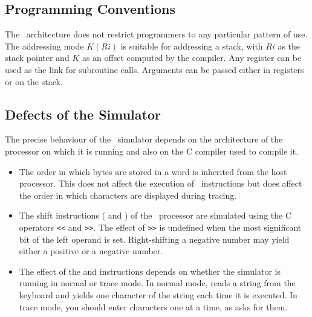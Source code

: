 \subsection{Programming Conventions}

The \moon\ architecture does not restrict programmers to any particular
pattern of use. The addressing mode $K(Ri)$ is suitable for addressing a
stack, with $Ri$ as the stack pointer and $K$ as an offset computed by
the compiler. Any register can be used as the link for subroutine calls.
Arguments can be passed either in registers or on the stack.

\subsection{Defects of the Simulator}

The precise behaviour of the \moon\ simulator depends on the
architecture of the processor on which it is running and also on the C
compiler used to compile it.

\begin{itemize}

\item The order in which bytes are stored in a word is inherited from
      the host processor. This does not affect the execution of \moon\
      instructions but does affect the order in which characters are
      displayed during tracing.

\item The shift instructions ( and ) of the \moon\
      processor are simulated using the C operators \verb"<<" and
      \verb">>". The effect of \verb">>" is undefined when the most
      significant bit of the left operand is set. Right-shifting a
      negative number may yield either a positive or a negative number.

\item The effect of the \kw{putc} and  instructions depends on
      whether the simulator is running in normal or trace mode. In
      normal mode,  reads a string from the keyboard and yields
      one character of the string each time it is executed. In trace
      mode, you should enter characters one at a time, as \kw{getc} asks
      for them.

\end{itemize}

